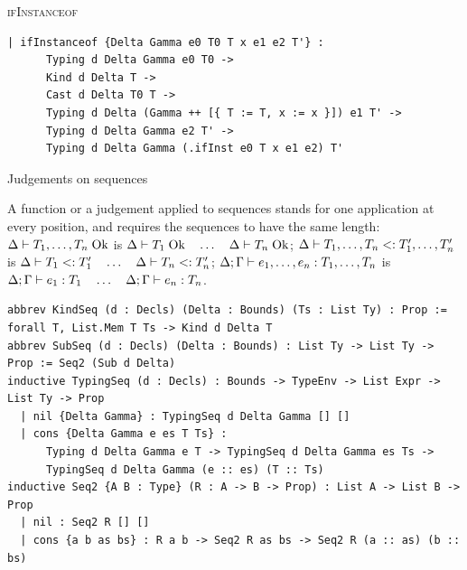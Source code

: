 \begin{cmp}{\textsc{ifInstanceof}}
\begin{paperside}
\end{paperside}
\begin{leanside}
\begin{lstlisting}[style=leanside]
  | ifInstanceof {Delta Gamma e0 T0 T x e1 e2 T'} :
      Typing d Delta Gamma e0 T0 ->
      Kind d Delta T ->
      Cast d Delta T0 T ->
      Typing d Delta (Gamma ++ [{ T := T, x := x }]) e1 T' ->
      Typing d Delta Gamma e2 T' ->
      Typing d Delta Gamma (.ifInst e0 T x e1 e2) T'
\end{lstlisting}
\end{leanside}
\end{cmp}

\begin{cmp}{Judgements on sequences}
\begin{paperside}
A function or a judgement applied to sequences stands for one application at every position, and requires the sequences to have the same length:
$\Delta \vdash T_1,\ldots,T_n\mskip5mu\mathrm{Ok}$ is $\Delta \vdash T_1\mskip5mu\mathrm{Ok}\quad\ldots\quad\Delta \vdash T_n\mskip5mu\mathrm{Ok}$;
$\Delta\vdash T_1,\ldots,T_n <: T'_1,\ldots,T'_n$ is $\Delta\vdash T_1 <: T'_1\quad\ldots\quad\Delta\vdash T_n <: T'_n$;
$\Delta;\Gamma\vdash e_1,\ldots,e_n : T_1,\ldots,T_n$ is $\Delta;\Gamma\vdash e_1 : T_1\quad\ldots\quad\Delta;\Gamma\vdash e_n : T_n$.
\end{paperside}
\begin{leanside}
\begin{lstlisting}[style=leanside]
abbrev KindSeq (d : Decls) (Delta : Bounds) (Ts : List Ty) : Prop := forall T, List.Mem T Ts -> Kind d Delta T
abbrev SubSeq (d : Decls) (Delta : Bounds) : List Ty -> List Ty -> Prop := Seq2 (Sub d Delta)
inductive TypingSeq (d : Decls) : Bounds -> TypeEnv -> List Expr -> List Ty -> Prop
  | nil {Delta Gamma} : TypingSeq d Delta Gamma [] []
  | cons {Delta Gamma e es T Ts} :
      Typing d Delta Gamma e T -> TypingSeq d Delta Gamma es Ts ->
      TypingSeq d Delta Gamma (e :: es) (T :: Ts)
inductive Seq2 {A B : Type} (R : A -> B -> Prop) : List A -> List B -> Prop
  | nil : Seq2 R [] []
  | cons {a b as bs} : R a b -> Seq2 R as bs -> Seq2 R (a :: as) (b :: bs)
\end{lstlisting}
\end{leanside}
\end{cmp}

